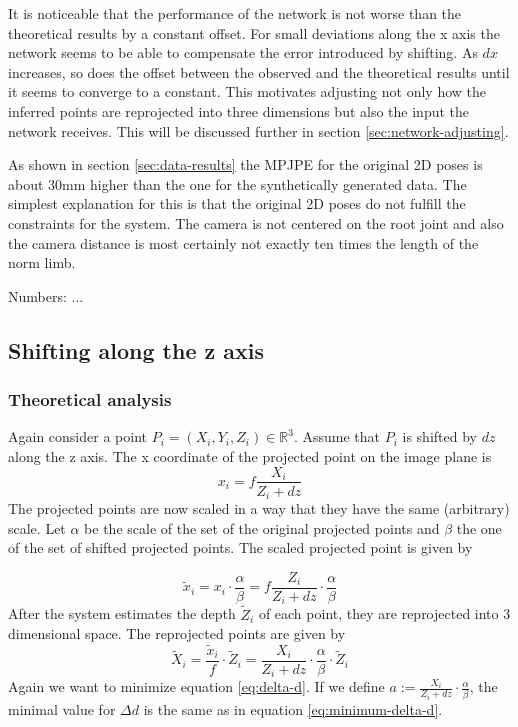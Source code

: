 It is noticeable that the performance of the network is not worse than the theoretical results by a constant offset.
For small deviations along the x axis the network seems to be able to compensate the error introduced by shifting.
As $dx$ increases, so does the offset between the observed and the theoretical results until it seems to converge to a constant.
This motivates adjusting not only how the inferred points are reprojected into three dimensions but also the input the network receives.
This will be discussed further in section \ref{sec:network-adjusting}.

As shown in section \ref{sec:data-results} the MPJPE for the original 2D poses is about  30mm higher than the one for the synthetically generated data.
The simplest explanation for this is that the original 2D poses do not fulfill the constraints for the system.
The camera is not centered on the root joint and also the camera distance is most certainly not exactly ten times the length of the norm limb.

Numbers: ...
	
\subsection{Shifting along the z axis}
\label{sec:z-shift-error}
\subsubsection{Theoretical analysis}
Again consider a point $P_i=(X_i, Y_i, Z_i) \in \mathbb{R}^3$. Assume that $P_i$ is shifted by $dz$ along the z axis.
The x coordinate of the projected point on the image plane is
\begin{equation}
	x_i = f \frac{X_i}{Z_i + dz}
\end{equation}
The projected points are now scaled in a way that they have the same (arbitrary) scale.  Let $\alpha$ be the scale of the set of the original projected points and $\beta$ the one of the set of shifted projected points. The scaled projected point is given by

\begin{equation}
		\widetilde{x}_i = x_i \cdot \frac{\alpha}{\beta} 
		= f \frac{Z_i}{Z_i + dz}\cdot \frac{\alpha}{\beta} 
\end{equation}
After the system estimates the depth $\widetilde{Z}_i$ of each point, they are reprojected into 3 dimensional space.
The reprojected points are given by
\begin{equation}
	\widetilde{X}_i = \frac{\widetilde{x}_i}{f} \cdot \widetilde{Z}_i
	= \frac{X_i}{Z_i + dz}\cdot \frac{\alpha}{\beta}  \cdot \widetilde{Z}_i
\end{equation}
Again we want to minimize equation \eqref{eq:delta-d}.
If we define $a := \frac{X_i}{Z_i + dz}\cdot \frac{\alpha}{\beta}$, the minimal value for $\Delta d$ is the same as in equation \eqref{eq:minimum-delta-d}.


